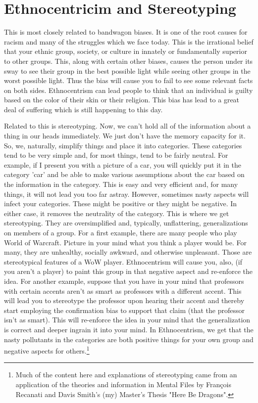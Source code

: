 \section{Ethnocentricim and Stereotyping}
This is most closely related to bandwagon biases. It is one of the root causes for racism and many of the struggles which we face today. This is the irrational belief that your ethnic group, society, or culture in innately or fundamentally superior to other groups. This, along with certain other biases, causes the person under its sway to see their group in the best possible light while seeing other groups in the worst possible light. Thus the bias will cause you to fail to see some relevant facts on both sides. Ethnocentrism can lead people to think that an individual is guilty based on the color of their skin or their religion. This bias has lead to a great deal of suffering which is still happening to this day.

Related to this is stereotyping. Now, we can't hold all of the information about a thing in our heads immediately. We just don't have the memory capacity for it. So, we, naturally, simplify things and place it into categories. These categories tend to be very simple and, for most things, tend to be fairly neutral. For example, if I present you with a picture of a car, you will quickly put it in the category 'car' and be able to make various assumptions about the car based on the information in the category. This is easy and very efficient and, for many things, it will not lead you too far astray. However, sometimes nasty aspects will infect your categories. These might be positive or they might be negative. In either case, it removes the neutrality of the category. This is where we get stereotyping. They are oversimplified and, typically, unflattering, generalizations on members of a group. For a first example, there are many people who play World of Warcraft. Picture in your mind what you think a player would be. For many, they are unhealthy, socially awkward, and otherwise unpleasant. Those are stereotypical features of a WoW player. Ethnocentrism will cause you, also, (if you aren't a player) to paint this group in that negative aspect and re-enforce the idea. For another example, suppose that you have in your mind that professors with certain accents aren't as smart as professors with a different accent. This will lead you to stereotype the professor upon hearing their accent and thereby start employing the confirmation bias to support that claim (that the professor isn't as smart). This will re-enforce the idea in your mind that the generalization is correct and deeper ingrain it into your mind. In Ethnocentrism, we get that the nasty pollutants in the categories are both positive things for your own group and negative aspects for others.\footnote{Much of the content here and explanations of stereotyping came from an application of the theories and information in Mental Files by François Recanati and Davis Smith's (my) Master's Thesis "Here Be Dragons".}

